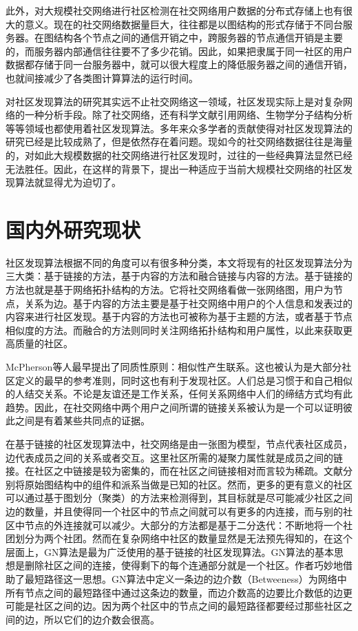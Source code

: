此外，对大规模社交网络进行社区检测在社交网络用户数据的分布式存储上也有很大的意义。现在的社交网络数据量巨大，往往都是以图结构的形式存储于不同台服务器。在图结构各个节点之间的通信开销之中，跨服务器的节点通信开销是主要的，而服务器内部通信往往要不了多少花销。因此，如果把隶属于同一社区的用户数据都存储于同一台服务器中，就可以很大程度上的降低服务器之间的通信开销，也就间接减少了各类图计算算法的运行时间。

对社区发现算法的研究其实远不止社交网络这一领域，社区发现实际上是对复杂网络的一种分析手段。除了社交网络，还有科学文献引用网络、生物学分子结构分析等等领域也都使用着社区发现算法。多年来众多学者的贡献使得对社区发现算法的研究已经是比较成熟了，但是依然存在着问题。现如今的社交网络数据往往是海量的，对如此大规模数据的社交网络进行社区发现时，过往的一些经典算法显然已经无法胜任。因此，在这样的背景下，提出一种适应于当前大规模社交网络的社区发现算法就显得尤为迫切了。

\section{国内外研究现状}
社区发现算法根据不同的角度可以有很多种分类，本文将现有的社区发现算法分为三大类：基于链接的方法，基于内容的方法和融合链接与内容的方法。基于链接的方法也就是基于网络拓扑结构的方法。它将社交网络看做一张网络图，用户为节点，关系为边。基于内容的方法主要是基于社交网络中用户的个人信息和发表过的内容来进行社区发现。基于内容的方法也可被称为基于主题的方法，或者基于节点相似度的方法。而融合的方法则同时关注网络拓扑结构和用户属性，以此来获取更高质量的社区。


McPherson等人最早提出了同质性原则：相似性产生联系\cite{Mcpherson2001Birds}。这也被认为是大部分社区定义的最早的参考准则，同时这也有利于发现社区。人们总是习惯于和自己相似的人结交关系。不论是友谊还是工作关系，任何关系网络中人们的缔结方式均有此趋势。因此，在社交网络中两个用户之间所谓的链接关系被认为是一个可以证明彼此之间是有着某些共同点的证据。

在基于链接的社区发现算法中，社交网络是由一张图为模型，节点代表社区成员，边代表成员之间的关系或者交互。这里社区所需的凝聚力属性就是成员之间的链接。在社区之中链接是较为密集的，而在社区之间链接相对而言较为稀疏。文献\cite{Fortunato2009Community}分别将原始图结构中的组件和派系当做是已知的社区。然而，更多的更有意义的社区可以通过基于图划分（聚类）的方法来检测得到，其目标就是尽可能减少社区之间边的数量，并且使得同一个社区中的节点之间就可以有更多的内连接，而与别的社区中节点的外连接就可以减少。大部分的方法都是基于二分迭代：不断地将一个社团划分为两个社团。然而在复杂网络中社区的数量显然是无法预先得知的，在这个层面上，GN算法\cite{2002Community}是最为广泛使用的基于链接的社区发现算法。GN算法的基本思想是删除社区之间的连接，使得剩下的每个连通部分就是一个社区。作者巧妙地借助了最短路径这一思想。GN算法中定义一条边的边介数（Betweeness）为网络中所有节点之间的最短路径中通过这条边的数量，而边介数高的边要比介数低的边更可能是社区之间的边。因为两个社区中的节点之间的最短路径都要经过那些社区之间的边，所以它们的边介数会很高。

